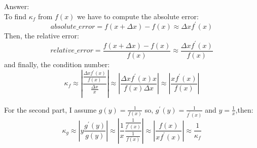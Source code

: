 \documentclass{article}
\begin{document}
Answer:\\
To find $\kappa_f$ from $f(x)$ we have to compute the absolute error:
$$absolute\_error = f(x+\Delta{x})-f(x) \approx \Delta{x}f^\prime(x)$$
Then, the relative error:
$$relative\_error = \frac{f(x+\Delta{x})-f(x)}{f(x)} \approx \frac{\Delta{x}f^\prime(x)}{f(x)}$$
and finally, the condition number:
$$\kappa_f \approx \left|\frac{\frac{\Delta{x}f^\prime(x)}{f(x)}}{\frac{\Delta{x}}{x}}\right| \approx \left|\frac{\Delta{x}f^\prime(x)x}{f(x)\Delta{x}}\right| \approx \left|\frac{xf^\prime(x)}{f(x)}\right|$$

For the second part, I assume $g(y)=\frac{1}{f(x)}$ so, $g^\prime(y)=\frac{1}{f^\prime(x)}$ and $y=\frac{1}{x}$,then:
$$\kappa_g \approx \left|y\frac{g^\prime(y)}{g(y)}\right| \approx \left|\frac{1}{x}\frac{\frac{1}{f^\prime(x)}}{\frac{1}{f(x)}}\right| \approx \left|\frac{f(x)}{xf^\prime(x)}\right| \approx \frac{1}{\kappa_f}$$
\end{document}

